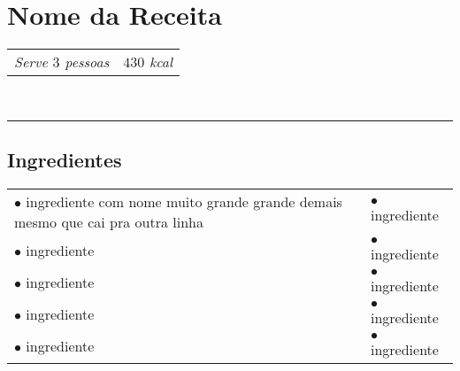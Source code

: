 \newpage
\noindent
\vspace*{-2.0cm}
\section*{\sectionformat Nome da Receita}
\vspace*{-0.1cm}
\begin{aemulticol}[width=0.495\textwidth,height=0.545\textheight]
	\begin{tabu} to 0.5\linewidth {X[l]X[r]}
	   \textit{Serve $3$ pessoas} & \textit{$430$ kcal}
	\end{tabu}\\
	\rule[0.5ex]{0.5\linewidth}{1pt}
	
	\vspace*{-0.3cm}
	\subsection*{\subsectionformat Ingredientes}
	\vspace*{-0.15cm}
	\begin{tabu} to 0.5\linewidth {X[l]X[l]}
	   $\bullet$ ingrediente com nome muito grande grande demais mesmo que cai pra outra linha & $\bullet$ ingrediente\\
	   $\bullet$ ingrediente & $\bullet$ ingrediente\\
	   $\bullet$ ingrediente & $\bullet$ ingrediente\\
	   $\bullet$ ingrediente & $\bullet$ ingrediente\\
	   $\bullet$ ingrediente & $\bullet$ ingrediente
	\end{tabu}

	\vspace*{-0.15cm}

\end{aemulticol}
